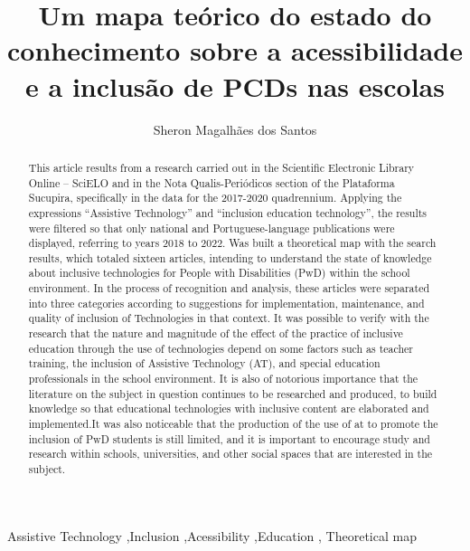 \documentclass[preprint, 3p,
authoryear]{elsarticle} %
\begin{document}
\begin{frontmatter}

  \title{Um mapa teórico do estado do conhecimento sobre a
acessibilidade e a inclusão de PCDs nas escolas}
    \author[Universidade Federal do Rio Grande]{Sheron Magalhães dos
Santos%
  }
  
  \begin{abstract}
  This article results from a research carried out in the Scientific
  Electronic Library Online -- SciELO and in the Nota Qualis-Periódicos
  section of the Plataforma Sucupira, specifically in the data for the
  2017-2020 quadrennium. Applying the expressions ``Assistive
  Technology'' and ``inclusion education technology'', the results were
  filtered so that only national and Portuguese-language publications
  were displayed, referring to years 2018 to 2022. Was built a
  theoretical map with the search results, which totaled sixteen
  articles, intending to understand the state of knowledge about
  inclusive technologies for People with Disabilities (PwD) within the
  school environment. In the process of recognition and analysis, these
  articles were separated into three categories according to suggestions
  for implementation, maintenance, and quality of inclusion of
  Technologies in that context. It was possible to verify with the
  research that the nature and magnitude of the effect of the practice
  of inclusive education through the use of technologies depend on some
  factors such as teacher training, the inclusion of Assistive
  Technology (AT), and special education professionals in the school
  environment. It is also of notorious importance that the literature on
  the subject in question continues to be researched and produced, to
  build knowledge so that educational technologies with inclusive
  content are elaborated and implemented.It was also noticeable that the
  production of the use of at to promote the inclusion of PwD students
  is still limited, and it is important to encourage study and research
  within schools, universities, and other social spaces that are
  interested in the subject.
  \end{abstract}
    \begin{keyword}
    Assistive
Technology \sep Inclusion \sep Acessibility \sep Education \sep 
    Theoretical map
  \end{keyword}
  
 \end{frontmatter}
\end{document}
